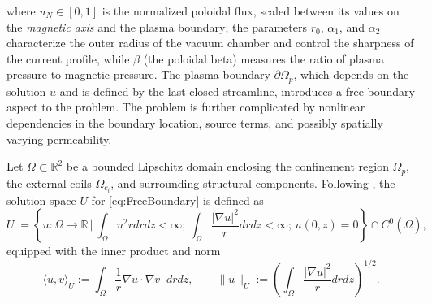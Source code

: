 %
where $u_N \in [0,1]$ is the normalized poloidal flux, scaled between its values on the \textit{magnetic axis} and the plasma boundary; the parameters $r_0$, $\alpha_1$, and $\alpha_2$ characterize the outer radius of the vacuum chamber and control the sharpness of the current profile, while $\beta$ (the poloidal beta) measures the ratio of plasma pressure to magnetic pressure. The plasma boundary $\partial \Omega_p$, which depends on the solution $u$ and is defined by the last closed streamline, introduces a free-boundary aspect to the problem. The problem is further complicated by nonlinear dependencies in the boundary location, source terms, and possibly spatially varying permeability.


Let $\Omega \subset \mathbb{R}^2$ be a bounded Lipschitz domain enclosing the confinement region $\Omega_p$, the external coils $\Omega_{c_i}$, and surrounding structural components.  Following \cite{Gr:1999}, the solution space $U$ for \eqref{eq:FreeBoundary} is defined as
%
\begin{equation}\label{eq:Soln_space}
    U:=\left\{u:\Omega\rightarrow \mathbb{R} \,\Bigg| \,\int_\Omega u^2rdrdz<\infty; \,  \int_\Omega\frac{|\nabla u|^2}{r}drdz<\infty; \, u(0,z)=0 \right\}\cap C^0(\overline{\Omega}),
\end{equation}
%
equipped with the inner product and norm
%
\begin{equation}\label{eq:inner_prod_norm}
        \langle u,v\rangle_U := \int_{\Omega} \frac{1}{r} \nabla u\cdot\nabla v \;\;drdz,\qquad \| u \|_{U} :=\left(\int_\Omega\frac{|\nabla u|^2}{r} drdz\right)^{1/2}.
\end{equation}
%

